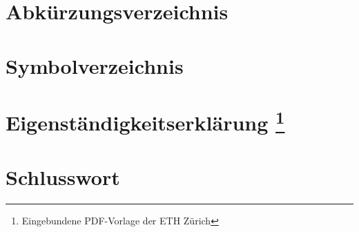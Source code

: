 \documentclass[twoside, 
               a4paper, 
               10pt, 
               parskip=full, 
               sectionentrydots=true, 
               listof=totoc, 
               listof=entryprefix,
               numbers=endperiod]{scrartcl}
\begin{document}

\newpage
\thispagestyle{empty}
\mbox{}

\newpage
{}
\renewcommand{\refname}{Literaturverzeichnis} 





\newpage
\thispagestyle{empty}
\mbox{}

\newpage
\section*{Abkürzungsverzeichnis} 
\label{abkuerzungen}
\begin{acronym}[SEPSEPSEP]
\setlength{\parskip}{0ex}

\end{acronym}




\newpage
\thispagestyle{empty}
\mbox{}

\newpage
\section*{Symbolverzeichnis}
\label{symbole} 





\newpage
\thispagestyle{empty}
\mbox{}

\newpage
{}
\section*{Eigenständigkeitserklärung
\footnote{Eingebundene PDF-Vorlage der ETH Zürich} 
\label{eigenstaendigkeitserklaerung}}
\begin{figure}

\end{figure}




\newpage
\thispagestyle{empty}
\mbox{}

\newpage
{}
\section*{Schlusswort}

\end{document}
